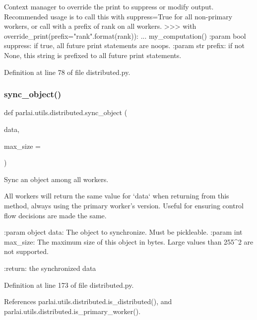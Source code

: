 \begin{DoxyVerb}Context manager to override the print to suppress or modify output.
Recommended usage is to call this with suppress=True for all non-primary workers,
or call with a prefix of rank on all workers.
>>> with override_print(prefix="rank{}".format(rank)):
...     my_computation()
:param bool suppress:
    if true, all future print statements are noops.
:param str prefix:
    if not None, this string is prefixed to all future print statements.
\end{DoxyVerb}
 

Definition at line 78 of file distributed.\+py.

\mbox{\label{namespaceparlai_1_1utils_1_1distributed_a269d3c7284127d9b287b9b61e9161de6}} 
\subsubsection{\texorpdfstring{sync\+\_\+object()}{sync\_object()}}
{\footnotesize\ttfamily def parlai.\+utils.\+distributed.\+sync\+\_\+object (\begin{DoxyParamCaption}\item[{}]{data,  }\item[{}]{max\+\_\+size = {} }\end{DoxyParamCaption})}

\begin{DoxyVerb}Sync an object among all workers.

All workers will return the same value for `data` when returning from this
method, always using the primary worker's version. Useful for ensuring control
flow decisions are made the same.

:param object data:
    The object to synchronize. Must be pickleable.
:param int max_size:
    The maximum size of this object in bytes. Large values than 255^2 are not
    supported.

:return: the synchronized data
\end{DoxyVerb}
 

Definition at line 173 of file distributed.\+py.



References parlai.\+utils.\+distributed.\+is\+\_\+distributed(), and parlai.\+utils.\+distributed.\+is\+\_\+primary\+\_\+worker().



